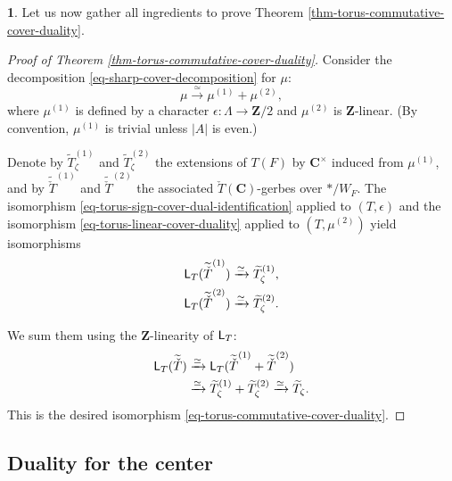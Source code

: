 \documentclass[10pt,english,reqno]{amsart}
\newcommand{\integers}{\mathbf Z}
\newcommand{\complexes}{\mathbf C}
\newcommand{\Langlands}{\textnormal{\textsf{L}}}
\theoremstyle{definition}
\numberwithin{equation}{section}
\newtheorem{untitledsubsubsection}[subsubsection]{}
\newenvironment{void}
{\begin{untitledsubsubsection}}
{\end{untitledsubsubsection}}
\begin{document}
\begin{void}
Let us now gather all ingredients to prove Theorem \ref{thm-torus-commutative-cover-duality}.
\begin{proof}[Proof of Theorem \ref{thm-torus-commutative-cover-duality}]
Consider the decomposition \eqref{eq-sharp-cover-decomposition} for $\mu$:
$$
\mu \xrightarrow{\simeq} \mu^{(1)} + \mu^{(2)},
$$
where $\mu^{(1)}$ is defined by a character $\epsilon : \Lambda \rightarrow \integers/2$ and $\mu^{(2)}$ is $\integers$-linear. (By convention, $\mu^{(1)}$ is trivial unless $|A|$ is even.)

Denote by $\widetilde T^{(1)}_{\zeta}$ and $\widetilde T^{(2)}_{\zeta}$ the extensions of $T(F)$ by $\complexes^{\times}$ induced from $\mu^{(1)}$, and by $\widetilde{\check T}^{(1)}$ and $\widetilde{\check T}^{(2)}$ the associated $\check T(\complexes)$-gerbes over $*/W_F$. The isomorphism \eqref{eq-torus-sign-cover-dual-identification} applied to $(T, \epsilon)$ and the isomorphism \eqref{eq-torus-linear-cover-duality} applied to $(T, \mu^{(2)})$ yield isomorphisms
\begin{align*}
	\Langlands_T(\widetilde{\check T}^{(1)}) & \xrightarrow{\simeq} \widetilde T_{\zeta}^{(1)}, \\
	\Langlands_T(\widetilde{\check T}^{(2)}) & \xrightarrow{\simeq} \widetilde T_{\zeta}^{(2)}.
\end{align*}

We sum them using the $\integers$-linearity of $\Langlands_T$:
\begin{align*}
\Langlands_T(\widetilde{\check T}) & \xrightarrow{\simeq} \Langlands_T(\widetilde{\check T}^{(1)} + \widetilde{\check T}^{(2)}) \\
& \xrightarrow{\simeq} \widetilde T_{\zeta}^{(1)} + \widetilde T_{\zeta}^{(2)} \xrightarrow{\simeq}  \widetilde T_{\zeta}.
\end{align*}
This is the desired isomorphism \eqref{eq-torus-commutative-cover-duality}.
\end{proof}
\end{void}



\subsection{Duality for the center}
\label{sec-duality-for-center}
\end{document}
